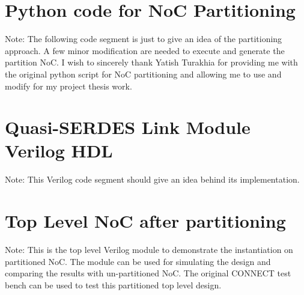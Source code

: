 \begin{appendix}
\newpage	
\section {Python code for NoC Partitioning}
\label{pythonCode}
Note: The following code segment is just to give an idea of the partitioning approach. A few minor modification are needed to execute and generate the partition NoC. I wish to sincerely thank Yatish Turakhia for providing me with the original python script for NoC partitioning and allowing me to use and modify for my project thesis work.  


\newpage	
\section {Quasi-SERDES Link Module Verilog HDL}
\label{serdes}
Note: This Verilog code segment should give an idea behind its implementation.



\newpage	
\section {Top Level NoC after partitioning}
\label{NoCTop}
Note: This is the top level Verilog module to demonstrate the instantiation on partitioned NoC. The module can be used for simulating the design and comparing the results with un-partitioned NoC. The original CONNECT test bench can be used to test this partitioned top level design. 



\end{appendix}